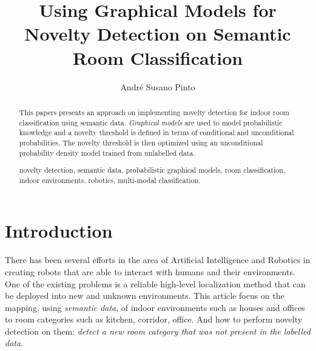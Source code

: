 \documentclass[runningheads,a4paper]{llncs}
\newcommand{\keywords}[1]{\par\addvspace\baselineskip
\noindent\keywordname\enspace\ignorespaces#1}
\begin{document}
\mainmatter  %

\title{Using Graphical Models for Novelty Detection on Semantic Room Classification}


%
%
\author{André Susano Pinto}
%


\maketitle


\begin{abstract}
This papers presents an approach on implementing novelty detection for indoor room classification
using semantic data.
\emph{Graphical models} are used to model probabilistic knowledge and a novelty threshold is
defined in terms of conditional and unconditional probabilities.
The novelty threshold is then optimized using an unconditional probability density
model trained from unlabelled data.


\keywords{novelty detection, semantic data, probabilistic graphical models,
room classification, indoor environments, robotics, multi-modal classification.}
\end{abstract}


\section{Introduction}
There has been several efforts in the area of Artificial Intelligence and Robotics in creating
robots that are able to interact with humans and their environments.
One of the existing problems is a reliable high-level localization method that can be deployed
into new and unknown environments.
This article focus on the mapping, using \emph{semantic data}, of indoor environments such as
houses and offices to room categories such as kitchen, corridor, office.
And how to perform novelty detection on them: \emph{detect a new room category that was not
present in the labelled data}.
\end{document}
